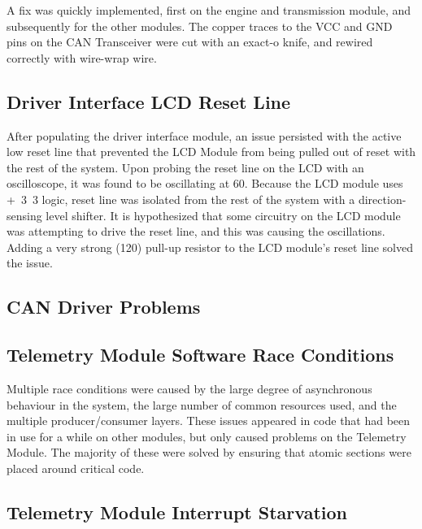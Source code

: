 A fix was quickly implemented, first on the engine and transmission module, and subsequently for the other modules. The copper traces to the VCC and GND pins on the CAN Transceiver were cut with an exact-o knife, and rewired correctly with wire-wrap wire.

\subsection{Driver Interface LCD Reset Line}

After populating the driver interface module, an issue persisted with the active low reset line that prevented the LCD Module from being pulled out of reset with the rest of the system. Upon probing the reset line on the LCD with an oscilloscope, it was found to be oscillating at \unit{60}{\mega\hertz}. Because the LCD module uses \unit{+3.3}{\volt} logic, reset line was isolated from the rest of the system with a direction-sensing level shifter. It is hypothesized that some circuitry on the LCD module was attempting to drive the reset line, and this was causing the oscillations. Adding a very strong (\unit{120}{\ohm}) pull-up resistor to the LCD module's reset line solved the issue.

\subsection{CAN Driver Problems}

\subsection{Telemetry Module Software Race Conditions}

Multiple race conditions were caused by the large degree of asynchronous behaviour in the system, the large number of common resources used, and the multiple producer/consumer layers. These issues appeared in code that had been in use for a while on other modules, but only caused problems on the Telemetry Module. The majority of these were solved by ensuring that atomic sections were placed around critical code.

\subsection{Telemetry Module Interrupt Starvation}

